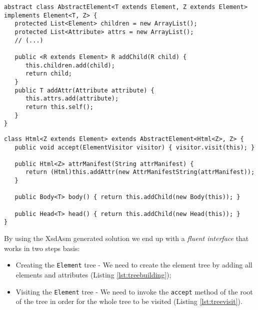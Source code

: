 \bigskip


\begin{minipage}{\linewidth}
\begin{lstlisting}[caption={AbstractElement Class Generated by XsdAsm},label={lst:abstractelementasm}]
abstract class AbstractElement<T extends Element, Z extends Element> implements Element<T, Z> {
   protected List<Element> children = new ArrayList();
   protected List<Attribute> attrs = new ArrayList();
   // (...)

   public <R extends Element> R addChild(R child) {
      this.children.add(child);
      return child;
   }
   public T addAttr(Attribute attribute) {
      this.attrs.add(attribute);
      return this.self();
   }
}
\end{lstlisting}
\end{minipage}

\bigskip


\begin{minipage}{\linewidth}
\begin{lstlisting}[caption={Html Class Generated by XsdAsm},label={lst:htmlasm}]
class Html<Z extends Element> extends AbstractElement<Html<Z>, Z> {
   public void accept(ElementVisitor visitor) { visitor.visit(this); }
   
   public Html<Z> attrManifest(String attrManifest) {
      return (Html)this.addAttr(new AttrManifestString(attrManifest));
   }
   
   public Body<T> body() { return this.addChild(new Body(this)); }
   
   public Head<T> head() { return this.addChild(new Head(this)); }
}
\end{lstlisting}
\end{minipage}

\noindent
By using the XsdAsm generated solution we end up with a \textit{fluent interface} that works in two steps basis:

\begin{itemize}  
	\item Creating the \texttt{Element} tree - We need to create the element tree by adding all elements and attributes (Listing \ref{lst:treebuilding});
	\item Visiting the \texttt{Element} tree - We need to invoke the \texttt{accept} method of the root of the tree in order for the whole tree to be visited (Listing \ref{lst:treevisit}).
\end{itemize}

